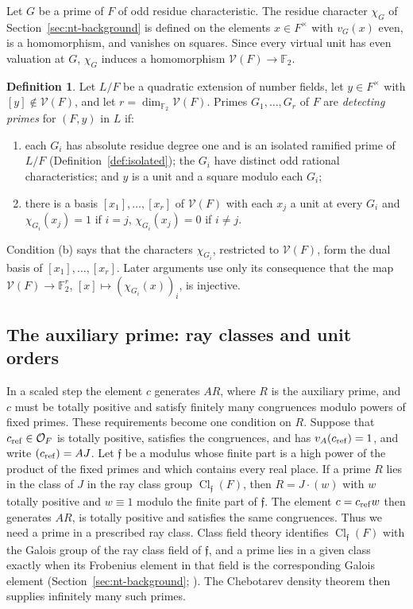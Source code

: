 \documentclass[11pt]{article}
\theoremstyle{plain}
\theoremstyle{definition}
\newtheorem{definition}[theorem]{Definition}
\theoremstyle{remark}
\DeclareMathOperator{\Cl}{Cl}
\newcommand{\F}{\mathbb F}
\newcommand{\OO}{\mathcal O}
\begin{document}
Let $G$ be a prime of $F$ of odd residue characteristic.  The residue
character $\chi_G$ of Section~\ref{sec:nt-background} is defined on the
elements $x\in F^\times$ with $v_G(x)$ even, is a homomorphism, and
vanishes on squares.  Since every virtual unit has even valuation at $G$,
$\chi_G$ induces a homomorphism $\mathcal V(F)\to\F_2$.

\begin{definition}\label{def:detecting}
Let $L/F$ be a quadratic extension of number fields, let $y\in F^\times$
with $[y]\notin\mathcal V(F)$, and let $r=\dim_{\F_2}\mathcal V(F)$.
Primes $G_1,\dots,G_r$ of $F$ are \emph{detecting primes} for
$(F,y)$ in $L$ if:
\begin{enumerate}
\item[(a)] each $G_i$ has absolute residue degree one and is an isolated
ramified prime of $L/F$ (Definition~\ref{def:isolated}); the $G_i$ have
distinct odd rational characteristics; and $y$ is a unit and a square
modulo each $G_i$;
\item[(b)] there is a basis $[x_1],\dots,[x_r]$ of $\mathcal V(F)$ with
each $x_j$ a unit at every $G_i$ and $\chi_{G_i}(x_j)=1$ if $i=j$,
$\chi_{G_i}(x_j)=0$ if $i\ne j$.
\end{enumerate}
\end{definition}
Condition (b) says that the characters $\chi_{G_i}$, restricted to
$\mathcal V(F)$, form the dual basis of $[x_1],\dots,[x_r]$.  Later
arguments use only its consequence that the map $\mathcal V(F)\to\F_2^r$,
$[x]\mapsto(\chi_{G_i}(x))_i$, is injective.

\subsection{The auxiliary prime: ray classes and unit orders}\label{sec:auxiliary-prime}
In a scaled step the element $c$ generates $AR$, where $R$ is the
auxiliary prime, and $c$ must be totally positive and satisfy finitely
many congruences modulo powers of fixed primes.  These requirements
become one condition on $R$.  Suppose that $c_{\rm ref}\in\OO_F$ is
totally positive, satisfies the congruences, and has $v_A(c_{\rm
ref})=1$, and write $(c_{\rm ref})=AJ$.  Let $\mathfrak f$ be a modulus
whose finite part is a high power of the product of the fixed primes and
which contains every real place.  If a prime $R$ lies in the class of
$J$ in the ray class group $\Cl_{\mathfrak f}(F)$, then $R=J\cdot(w)$
with $w$ totally positive and $w\equiv1$ modulo the finite part
of $\mathfrak f$.  The element $c=c_{\rm ref}w$ then generates $AR$,
is totally positive and satisfies the same congruences.  Thus we need a
prime in a prescribed ray class.  Class field theory identifies
$\Cl_{\mathfrak f}(F)$ with the Galois group of the ray class field of
$\mathfrak f$, and a prime lies in a given class exactly when its
Frobenius element in that field is the corresponding Galois element
(Section~\ref{sec:nt-background}; \cite[Chapter~V, Theorems~3.5
and~3.6]{MilneCFT}).  The Chebotarev density theorem \cite[Chapter~VIII,
Theorem~7.4]{MilneCFT} then supplies infinitely many such primes.
\end{document}
